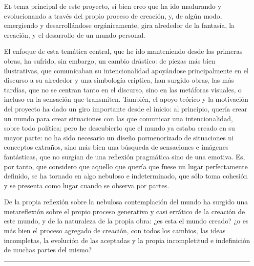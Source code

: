 \documentclass[twoside]{article}
\begin{document}
\begin{multicols}{2}

  \lettrine[nindent=0em,lines=3]{E}l tema principal de este proyecto, si bien creo que ha ido madurando y
  evolucionando a través del propio proceso de creación, y, de algún modo,
  emergiendo y desarrollándose orgánicamente, gira alrededor de la
  fantasía, la creación, y el desarrollo de un mundo personal.

  El enfoque de esta temática central, que he ido manteniendo desde las
  primeras obras, ha sufrido, sin embargo, un cambio drástico: de piezas
  más bien ilustrativas, que comunicaban su intencionalidad apoyándose
  principalmente en el discurso a su alrededor y una simbología críptica,
  han surgido obras, las más tardías, que no se centran tanto en el
  discurso, sino en las metáforas visuales, o incluso en la sensación que
  transmiten. También, el apoyo teórico y la motivación del proyecto ha
  dado un giro importante desde el inicio: al principio, quería crear un
  mundo para crear situaciones con las que comunicar una intencionalidad,
  sobre todo política; pero he descubierto que el mundo ya estaba creado
  en su mayor parte: no ha sido necesario un diseño pormenorizado de
  situaciones ni conceptos extraños, sino más bien una búsqueda de
  sensaciones e imágenes fantásticas, que no surgían de una reflexión
  pragmática sino de una emotiva. Es, por tanto, que considero que aquello
  que quería que fuese un lugar perfectamente definido, se ha tornado en
  algo nebuloso e indeterminado, que sólo toma cohesión y se presenta como
  lugar cuando se observa por partes.

  De la propia reflexión sobre la nebulosa contemplación del mundo ha
  surgido una metareflexión sobre el propio proceso generativo y casi
  errático de la creación de este mundo, y de la naturaleza de la propia
  obra: ¿es esta el mundo creado? ¿o es más bien el proceso agregado de
  creación, con todos los cambios, las ideas incompletas, la evolución de
  las aceptadas y la propia incompletitud e indefinición de muchas partes
  del mismo?

  \begin{center}\rule{0.5\linewidth}{0.5pt}\end{center}


\end{multicols}
\end{document}
